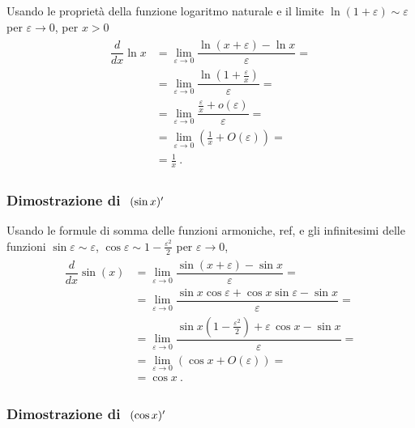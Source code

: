\documentclass[letterpaper,10pt,english]{jupyterBook}
\begin{document}
\sphinxAtStartPar
Usando le proprietà della funzione logaritmo naturale e il limite \(\ln(1 + \varepsilon) \sim \varepsilon\) per \(\varepsilon \rightarrow 0\), per \(x > 0\)
\begin{equation*}
\begin{split}\begin{aligned}
  \dfrac{d}{dx} \ln x       
  & = \lim_{\varepsilon \rightarrow 0}  \dfrac{\ln(x+\varepsilon) - \ln x}{\varepsilon} = \\
  & = \lim_{\varepsilon \rightarrow 0}  \dfrac{\ln \left(1 + \frac{\varepsilon}{x} \right)}{\varepsilon} = \\
  & = \lim_{\varepsilon \rightarrow 0}  \dfrac{\frac{\varepsilon}{x} + o(\varepsilon)}{\varepsilon} = \\
  & = \lim_{\varepsilon \rightarrow 0}  \left( \frac{1}{x} + O(\varepsilon) \right) = \\
  & = \frac{1}{x} \ .
\end{aligned}\end{split}
\end{equation*}\subsubsection*{Dimostrazione di \protect\(\ (\sin x)'\protect\)}

\sphinxAtStartPar
Usando le formule di somma delle funzioni armoniche,  ref, e gli infinitesimi delle funzioni \(\sin \varepsilon \sim \varepsilon\), \(\cos \varepsilon \sim 1 - \frac{\varepsilon^2}{2}\) per \(\varepsilon \rightarrow 0\),
\begin{equation*}
\begin{split}\begin{aligned}
  \dfrac{d}{dx} \sin(x) 
  & = \lim_{\varepsilon \rightarrow 0}  \dfrac{\sin(x+\varepsilon) - \sin x}{\varepsilon} = \\
  & = \lim_{\varepsilon \rightarrow 0} \dfrac{\sin x \cos \varepsilon + \cos x \sin \varepsilon - \sin x}{\varepsilon} = \\
  & = \lim_{\varepsilon \rightarrow 0} \dfrac{\sin x \left( 1 - \frac{\varepsilon^2}{2} \right) + \varepsilon \, \cos x - \sin x}{\varepsilon} = \\
  & = \lim_{\varepsilon \rightarrow 0} \left( \cos x + O(\varepsilon) \right) = \\
  & = \cos x \ .
\end{aligned}\end{split}
\end{equation*}\subsubsection*{Dimostrazione di \protect\(\ (\cos x)'\protect\)}
\end{document}
